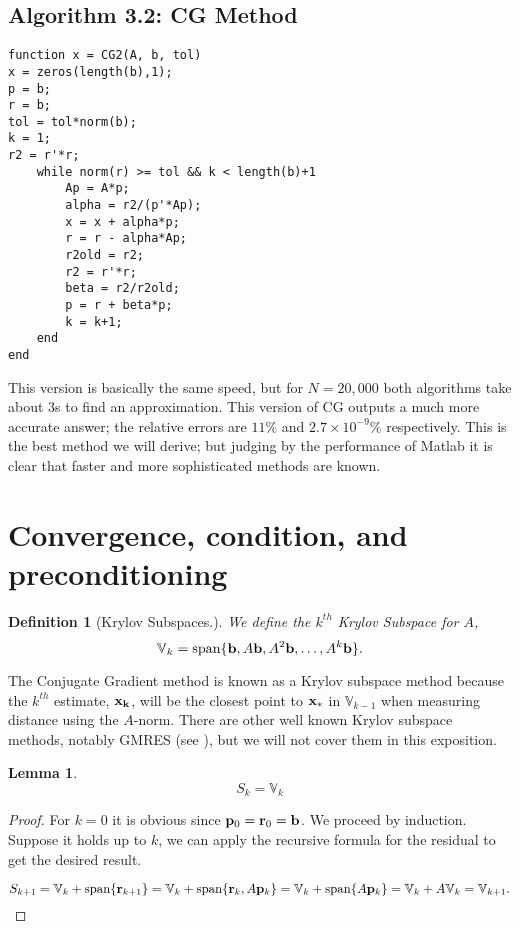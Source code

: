 \documentclass{article}
\newcommand{\bx}{{\bf x}}
\newcommand{\bb}{{\bf b}}
\newcommand{\br}{{\bf r}}
\newcommand{\bp}{{\bf p}}
\newcommand{\V}{\mathbb{V}}
\newcommand{\beq}{\begin{equation}}
\newcommand{\eeq}{\end{equation}}
\newtheorem{lemma}{Lemma}[section]
\newtheorem{defn}{Definition}[section]
\theoremstyle{remark}
\begin{document}
\subsection{Algorithm 3.2: CG Method}
\begin{lstlisting}
function x = CG2(A, b, tol)
x = zeros(length(b),1);
p = b;
r = b;
tol = tol*norm(b);
k = 1;
r2 = r'*r;
    while norm(r) >= tol && k < length(b)+1 
        Ap = A*p;
        alpha = r2/(p'*Ap);
        x = x + alpha*p;
        r = r - alpha*Ap;
        r2old = r2;
        r2 = r'*r;
        beta = r2/r2old;
        p = r + beta*p;
        k = k+1;    
    end
end
\end{lstlisting}

This version is basically the same speed, but for $N=20,000$ both algorithms take about $3$s to find an approximation. This version of CG outputs a much more accurate answer; the relative errors are $11\%$ and $2.7\times 10^{-9}\%$ respectively. This is the best method we will derive; but judging by the performance of Matlab it is clear that faster and more sophisticated methods are known. 


\section{Convergence, condition, and preconditioning}


\begin{defn}[Krylov Subspaces.] We define the $k^{th}$ Krylov Subspace for $A$,
\beq 
\V_k = \text{\normalfont span}\{\bb, A\bb, A^2\bb, \dots,  A^k \bb\}.
\eeq
\end{defn}


The Conjugate Gradient method is known as a Krylov subspace method because the $k^{th}$ estimate, $\bf x_k$, will be the closest point to $\bx_*$ in $\V_{k-1}$ when measuring distance using the $A$-norm. There are other well known Krylov subspace methods, notably GMRES (see \cite{KelleyCT}), but we will not cover them in this exposition. 
\begin{lemma} 
\beq
S_k = \V_k
\eeq
\end{lemma}
\begin{proof}
For $k = 0$ it is obvious since $\bp_0 = \br_0 = \bb$. We proceed by induction. Suppose it holds up to $k$, we can apply the recursive formula for the residual to get the desired result.

\beq
S_{k+1} = \V_k + \text{span}\{\br_{k+1} \} =  \V_k + \text{span}\{\br_{k} , A\bp_k\} = \V_k + \text{span}\{A\bp_k \} = \V_k + A\V_k = \V_{k+1}. 
\eeq
\end{proof}
\end{document}
